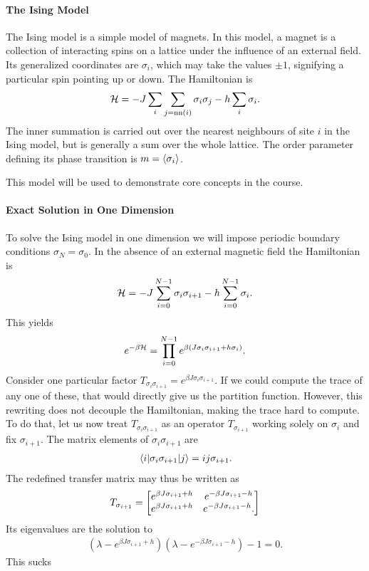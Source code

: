 \paragraph{The Ising Model}
The Ising model is a simple model of magnets. In this model, a magnet is a collection of interacting spins on a lattice under the influence of an external field. Its generalized coordinates are $\sigma_{i}$, which may take the values $\pm 1$, signifying a particular spin pointing up or down. The Hamiltonian is
\begin{align*}
	\mathcal{H} = -J\sum\limits_{i}\sum\limits_{j = \text{nn}(i)}\sigma_{i}\sigma_{j} - h\sum\limits_{i}\sigma_{i}.
\end{align*}
The inner summation is carried out over the nearest neighbours of site $i$ in the Ising model, but is generally a sum over the whole lattice. The order parameter defining its phase transition is $m = \expval{\sigma_{i}}$.

This model will be used to demonstrate core concepts in the course.

\paragraph{Exact Solution in One Dimension}
To solve the Ising model in one dimension we will impose periodic boundary conditions $\sigma_{N} = \sigma_{0}$. In the absence of an external magnetic field the Hamiltonian is
\begin{align*}
	\mathcal{H} = -J\sum\limits_{i = 0}^{N - 1}\sigma_{i}\sigma_{i + 1} - h\sum\limits_{i = 0}^{N - 1}\sigma_{i}.
\end{align*}
This yields
\begin{align*}
	e^{-\beta\mathcal{H}} = \prod\limits_{i = 0}^{N - 1}e^{\beta(J\sigma_{i}\sigma_{i + 1} + h\sigma_{i})}.
\end{align*}
Consider one particular factor $T_{\sigma_{i}\sigma_{i + 1}} = e^{\beta J\sigma_{i}\sigma_{i + 1}}$. If we could compute the trace of any one of these, that would directly give us the partition function. However, this rewriting does not decouple the Hamiltonian, making the trace hard to compute. To do that, let us now treat $T_{\sigma_{i}\sigma_{i + 1}}$ as an operator $T_{\sigma_{i + 1}}$ working solely on $\sigma_{i}$ and fix $\sigma_{i + 1}$. The matrix elements of $\sigma_{i}\sigma_{i + 1}$ are
\begin{align*}
	\mel{i}{\sigma_{i}\sigma_{i + 1}}{j} = ij\sigma_{i + 1}.
\end{align*}
The redefined transfer matrix may thus be written as
\begin{align*}
	T_{\sigma_{i + 1}} =
	\mqty[
		e^{\beta J \sigma_{i + 1} + h} & e^{-\beta J \sigma_{i + 1} - h} \\
		e^{\beta J \sigma_{i + 1} + h} & e^{-\beta J \sigma_{i + 1} - h}.
	]
\end{align*}
Its eigenvalues are the solution to
\begin{align*}
	\left(\lambda - e^{\beta J \sigma_{i + 1} + h}\right)\left(\lambda - e^{-\beta J \sigma_{i + 1} - h}\right) - 1 = 0.
\end{align*}
This sucks

